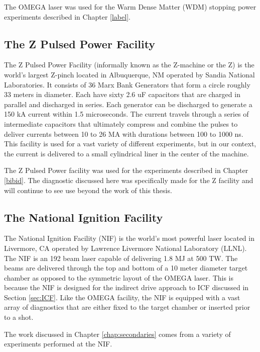 	
	\begin{figure}[h!]
		\centering
		\caption{}
	\end{figure}

	The OMEGA laser was used for the Warm Dense Matter (WDM) stopping power experiments described in Chapter \ref{label}.
	
	
	
	
\subsection{The Z Pulsed Power Facility}
\label{sec:ZMachine}

The Z Pulsed Power Facility (informally known as the Z-machine or the Z) is the world's largest Z-pinch located in Albuquerque, NM operated by Sandia National Laboratories. It consists of 36 Marx Bank Generators that form a circle roughly 33 meters in diameter. Each have sixty 2.6 uF capacitors that are charged in parallel and discharged in series. Each generator can be discharged to generate a 150 kA current within 1.5 microseconds. The current travels through a series of intermediate capacitors that ultimately compress and combine the pulses to deliver currents between 10 to 26 MA with durations between 100 to 1000 ns. This facility is used for a vast variety of different experiments, but in our context, the current is delivered to a small cylindrical liner in the center of the machine. 

\begin{figure}[h!]
	\centering
	\caption{}
\end{figure}

The Z Pulsed Power facility was used for the experiments described in Chapter \ref{bibid}. The diagnostic discussed here was specifically made for the Z facility and will continue to see use beyond the work of this thesis. 





\subsection{The National Ignition Facility}
\label{sec:NIF}

The National Ignition Facility (NIF) is the world's most powerful laser located in Livermore, CA operated by Lawrence Livermore National Laboratory (LLNL). The NIF is an 192 beam laser capable of delivering 1.8 MJ at 500 TW. The beams are delivered through the top and bottom of a 10 meter diameter target chamber as opposed to the symmetric layout of the OMEGA laser. This is because the NIF is designed for the indirect drive approach to ICF discussed in Section \ref{sec:ICF}. Like the OMEGA facility, the NIF is equipped with a vast array of diagnostics that are either fixed to the target chamber or inserted prior to a shot.  

The work discussed in Chapter \ref{chap:secondaries} comes from a variety of experiments performed at the NIF. 



